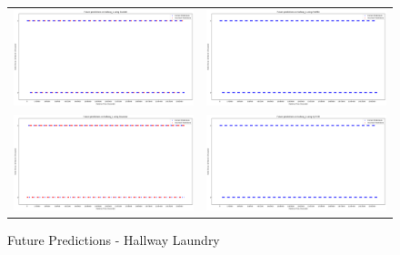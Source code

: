 \begin{figure}
  \begin{tabular}{cc}
    {\includegraphics[width = 3in]{images/results/Future_hallway_L_Duckett.png}} &
    {\includegraphics[width = 3in]{images/results/Future_hallway_L_FreMEn.png}} \\
    {\includegraphics[width = 3in]{images/results/Future_hallway_L_Gaussian.png}} &
    {\includegraphics[width = 3in]{images/results/Future_hallway_L_HyT-EM.png}} \\
  \end{tabular}
  \caption{Future Predictions - Hallway Laundry}
\end{figure}\\ \\

